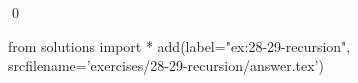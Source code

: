 
\begin{ex}
  \label{ex:28-29-recursion}
  
  \qed
\end{ex}
\begin{python0}
from solutions import *
add(label="ex:28-29-recursion",
    srcfilename='exercises/28-29-recursion/answer.tex')
\end{python0}
